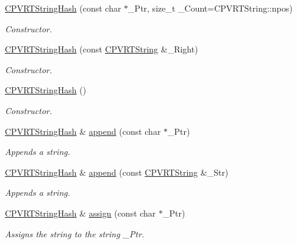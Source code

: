 \begin{DoxyCompactItemize}
\item 
\hyperlink{class_c_p_v_r_t_string_hash_a6c12861d93ca885e4265169ab34eb67e}{C\+P\+V\+R\+T\+String\+Hash} (const char $\ast$\+\_\+\+Ptr, size\+\_\+t \+\_\+\+Count=C\+P\+V\+R\+T\+String\+::npos)
\begin{DoxyCompactList}\small\item\em Constructor. \end{DoxyCompactList}\item 
\hyperlink{class_c_p_v_r_t_string_hash_a6f03de37b79ce05ce545dd9b4904b2d2}{C\+P\+V\+R\+T\+String\+Hash} (const \hyperlink{class_c_p_v_r_t_string}{C\+P\+V\+R\+T\+String} \&\+\_\+\+Right)
\begin{DoxyCompactList}\small\item\em Constructor. \end{DoxyCompactList}\item 
\hyperlink{class_c_p_v_r_t_string_hash_a0c0ac10ae8ab81b221dcd4b3240ae4b7}{C\+P\+V\+R\+T\+String\+Hash} ()
\begin{DoxyCompactList}\small\item\em Constructor. \end{DoxyCompactList}\item 
\hyperlink{class_c_p_v_r_t_string_hash}{C\+P\+V\+R\+T\+String\+Hash} \& \hyperlink{class_c_p_v_r_t_string_hash_a25c56754f13473fe2ccb47f108e55785}{append} (const char $\ast$\+\_\+\+Ptr)
\begin{DoxyCompactList}\small\item\em Appends a string. \end{DoxyCompactList}\item 
\hyperlink{class_c_p_v_r_t_string_hash}{C\+P\+V\+R\+T\+String\+Hash} \& \hyperlink{class_c_p_v_r_t_string_hash_ade25847f0ef6a4417d8c7649c2322223}{append} (const \hyperlink{class_c_p_v_r_t_string}{C\+P\+V\+R\+T\+String} \&\+\_\+\+Str)
\begin{DoxyCompactList}\small\item\em Appends a string. \end{DoxyCompactList}\item 
\hyperlink{class_c_p_v_r_t_string_hash}{C\+P\+V\+R\+T\+String\+Hash} \& \hyperlink{class_c_p_v_r_t_string_hash_a671e3c4178682488d3a88aab856b466b}{assign} (const char $\ast$\+\_\+\+Ptr)
\begin{DoxyCompactList}\small\item\em Assigns the string to the string \+\_\+\+Ptr. \end{DoxyCompactList}\item 

\end{DoxyCompactItemize}
